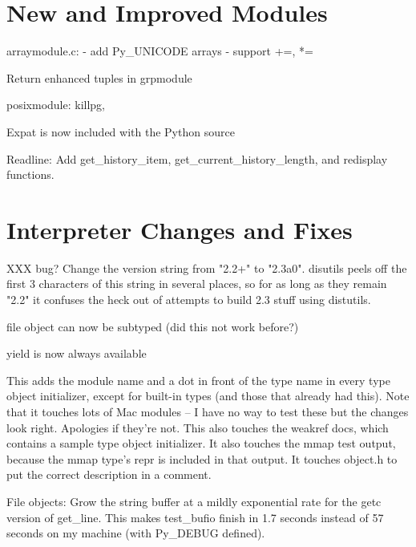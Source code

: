 \documentclass{howto}
\begin{document}
\begin{seealso}


\end{seealso}


\section{New and Improved Modules}

arraymodule.c: - add Py_UNICODE arrays
- support +=, *=

Return enhanced tuples in grpmodule

posixmodule: killpg, 

Expat is now included with the Python source

Readline: Add get_history_item, get_current_history_length, and
redisplay functions.


\section{Interpreter Changes and Fixes}

XXX bug?  Change the version string from "2.2+" to "2.3a0".  disutils peels off
the first 3 characters of this string in several places, so for as long
as they remain "2.2" it confuses the heck out of attempts to build 2.3
stuff using distutils.

file object can now be subtyped (did this not work before?)

yield is now always available

This adds the module name and a dot in front of the type name in every
type object initializer, except for built-in types (and those that
already had this).  Note that it touches lots of Mac modules -- I have
no way to test these but the changes look right.  Apologies if they're
not.  This also touches the weakref docs, which contains a sample type
object initializer.  It also touches the mmap test output, because the
mmap type's repr is included in that output.  It touches object.h to
put the correct description in a comment.

File objects: Grow the string buffer at a mildly exponential rate for
the getc version of get_line.  This makes test_bufio finish in 1.7
seconds instead of 57 seconds on my machine (with Py_DEBUG defined).
\end{document}
